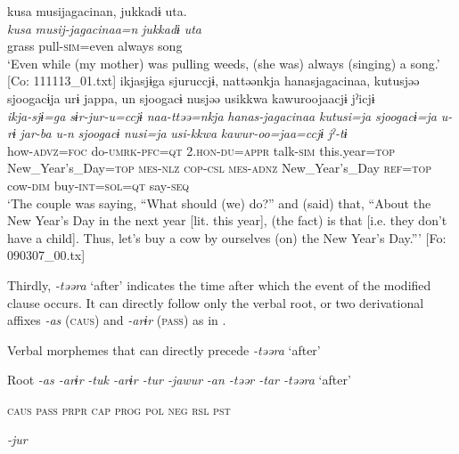 \ea
{\TM}
\glll  kusa  musijagacinan,  jukkadɨ  uta.\\
\textit{kusa}  \textit{musij-jagacinaa=n}  \textit{jukkadɨ}  \textit{uta}\\
grass  pull-\textsc{sim}=even  always  song\\
\glt ‘Even while (my mother) was pulling weeds, (she was) always (singing) a song.’ [Co: 111113\_01.txt]
\ex
{\TM}
\glll  ikjasjɨga  sjuruccjɨ,  nattəənkja  hanasjagacinaa,      kutusjəə  sjoogacɨja  urɨ  jappa,  un      sjoogacɨ  nusjəə  usikkwa  kawuroojaacjɨ  jˀicjɨ\\
\textit{ikja-sjɨ=ga}  \textit{sɨr-jur-u=ccjɨ}  \textit{naa-ttəə=nkja}  \textit{hanas-jagacinaa} \textit{kutusi=ja}  \textit{sjoogacɨ=ja}  \textit{u-rɨ}  \textit{jar-ba}  \textit{u-n}     \textit{sjoogacɨ}  \textit{nusi=ja}  \textit{usi-kkwa}  \textit{kawur-oo=jaa=ccjɨ}  \textit{jˀ-tɨ}\\
how-\textsc{advz}=\textsc{foc}  do-\textsc{umrk}-\textsc{pfc}=\textsc{qt}  2.\textsc{hon}-\textsc{du}=\textsc{appr}  talk-\textsc{sim}    this.year=\textsc{top}  New\_Year’s\_Day=\textsc{top}  \textsc{mes}-\textsc{nlz}  \textsc{cop}-\textsc{csl}  \textsc{mes}-\textsc{adnz}  New\_Year’s\_Day  \textsc{ref}=\textsc{top}  cow-\textsc{dim}  buy-\textsc{int}=\textsc{sol}=\textsc{qt}  say-\textsc{seq}\\
\glt ‘The couple was saying, “What should (we) do?” and (said) that, “About the New Year’s Day in the next year [lit. this year], (the fact) is that [i.e. they don’t have a child]. Thus, let’s buy a cow by ourselves (on) the New Year’s Day.”’ [Fo: 090307\_00.tx]

\z
\z

  Thirdly, \textit{-təəra} ‘after’ indicates the time after which the event of the modified clause occurs. It can directly follow only the verbal root, or two derivational affixes \textit{-as} (\textsc{caus}) and \textit{-arɨr} (\textsc{pass}) as in .

\ea\label{ex:8-99}
  Verbal morphemes that can directly precede \textit{-təəra} ‘after’

  Root  \textit{-as  -arɨr} %
\textit{-tuk  -arɨr  -tur  -jawur} %
\textit{-an  -təər  -tar  -təəra} ‘after’

    \textsc{caus}  \textsc{pass}  \textsc{prpr}  \textsc{cap}  \textsc{prog}  \textsc{pol}  \textsc{neg}  \textsc{rsl}  \textsc{pst}

          \textit{-jur}

